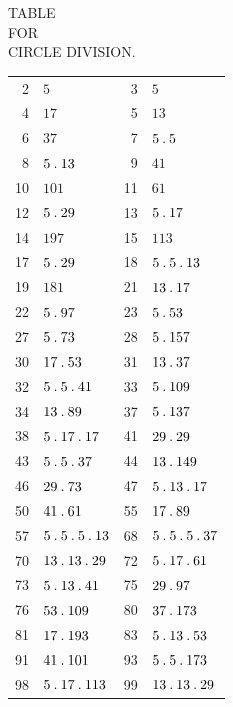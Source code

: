 \clearpage
{}%
\renewcommand{\BookRunningTitle}{Table for Circle Division}
\begin{center}
{\large TABLE}\\[3pt]
{FOR}\\[3pt]
{CIRCLE DIVISION.}
\end{center}
%
\renewcommand{\BookRunningTitle}{Table for Circle Division}
\begingroup\small\setlength{\tabcolsep}{4pt}
\begin{longtable}{@{}r|l@{\qquad}r|l@{}}
2 & $5$ & 3 & $5$\\
4 & $17$ & 5 & $13$\\
6 & $37$ & 7 & $5\mathbin{.} 5$\\
8 & $5\mathbin{.} 13$ & 9 & $41$\\
10 & $101$ & 11 & $61$\\
12 & $5\mathbin{.} 29$ & 13 & $5\mathbin{.} 17$\\
14 & $197$ & 15 & $113$\\
17 & $5\mathbin{.} 29$ & 18 & $5\mathbin{.} 5\mathbin{.} 13$\\
19 & $181$ & 21 & $13\mathbin{.} 17$\\
22 & $5\mathbin{.} 97$ & 23 & $5\mathbin{.} 53$\\
27 & $5\mathbin{.} 73$ & 28 & $5\mathbin{.} 157$\\
30 & $17\mathbin{.} 53$ & 31 & $13\mathbin{.} 37$\\
32 & $5\mathbin{.} 5\mathbin{.} 41$ & 33 & $5\mathbin{.} 109$\\
34 & $13\mathbin{.} 89$ & 37 & $5\mathbin{.} 137$\\
38 & $5\mathbin{.} 17\mathbin{.} 17$ & 41 & $29\mathbin{.} 29$\\
43 & $5\mathbin{.} 5\mathbin{.} 37$ & 44 & $13\mathbin{.} 149$\\
46 & $29\mathbin{.} 73$ & 47 & $5\mathbin{.} 13\mathbin{.} 17$\\
50 & $41\mathbin{.} 61$ & 55 & $17\mathbin{.} 89$\\
57 & $5\mathbin{.} 5\mathbin{.} 5\mathbin{.} 13$ & 68 & $5\mathbin{.} 5\mathbin{.} 5\mathbin{.} 37$\\
70 & $13\mathbin{.} 13\mathbin{.} 29$ & 72 & $5\mathbin{.} 17\mathbin{.} 61$\\
73 & $5\mathbin{.} 13\mathbin{.} 41$ & 75 & $29\mathbin{.} 97$\\
76 & $53\mathbin{.} 109$ & 80 & $37\mathbin{.} 173$\\
81 & $17\mathbin{.} 193$ & 83 & $5\mathbin{.} 13\mathbin{.} 53$\\
91 & $41\mathbin{.} 101$ & 93 & $5\mathbin{.} 5\mathbin{.} 173$\\
98 & $5\mathbin{.} 17\mathbin{.} 113$ & 99 & $13\mathbin{.} 13\mathbin{.} 29$\\

\end{longtable}
